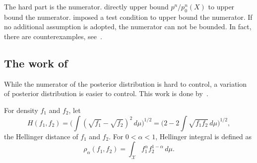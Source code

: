 \documentclass[3p]{elsarticle}
\theoremstyle{plain}
\theoremstyle{definition}
\theoremstyle{remark}
\begin{document}
The hard part is the numerator.
\cite{Shen2001Rates} directly upper bound $p^n/p_0^n (X)$ to upper bound the numerator.
\cite{Ghosal2000Asymptotic} imposed a test condition to upper bound the numerator.
If no additional assumption is adopted, the numerator can not be bounded.
In fact, there are counterexamples, see~\cite{diaconis1986consistency}.
\subsection{The work of~\cite{kar10563}}
While the numerator of the posterior distribution is hard to control, a variation of posterior distribution is easier to control.
This work is done by~\cite{kar10563}.

For density $f_1$ and $f_2$, let
$$H(f_1,f_2)=\Big(\int(\sqrt{f_1}-\sqrt{f_2})^2 \, d \mu\Big)^{1/2}=\Big(2-2\int \sqrt{f_1 f_2}\, d \mu \Big)^{1/2},$$
the Hellinger distance of $f_1$ and $f_2$.
For $0<\alpha<1$, Hellinger integral is defined as
$$
\rho_{\alpha}(f_1,f_2)=\int_{\mathcal{X}} f_1^{\alpha} f_2^{1-\alpha} \, d \mu.
$$
\end{document}
